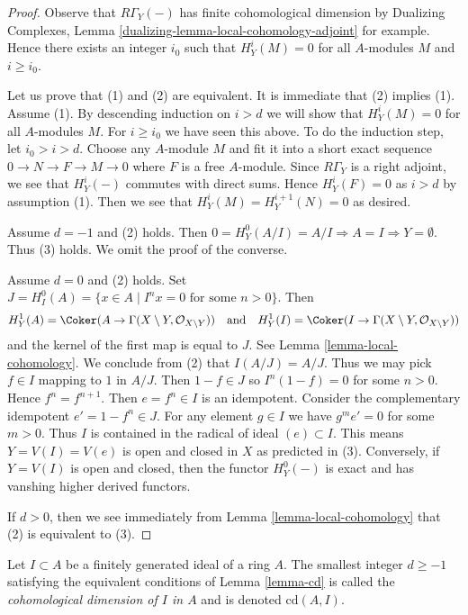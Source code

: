 \begin{proof}
Observe that $R\Gamma_Y(-)$ has finite cohomological dimension by
Dualizing Complexes, Lemma \ref{dualizing-lemma-local-cohomology-adjoint}
for example. Hence there exists an integer $i_0$ such that
$H^i_Y(M) = 0$ for all $A$-modules $M$ and $i \geq i_0$.

\medskip\noindent
Let us prove that (1) and (2) are equivalent. It is immediate that
(2) implies (1). Assume (1). By descending induction on $i > d$
we will show that $H^i_Y(M) = 0$ for all $A$-modules $M$.
For $i \geq i_0$ we have seen this above. To do the induction step,
let $i_0 > i > d$. Choose any $A$-module $M$ and fit it into
a short exact sequence $0 \to N \to F \to M \to 0$ where $F$ is a
free $A$-module. Since $R\Gamma_Y$ is a right adjoint, we see that
$H^i_Y(-)$ commutes with direct sums. Hence $H^i_Y(F) = 0$
as $i > d$ by assumption (1). Then we see that
$H^i_Y(M) = H^{i + 1}_Y(N) = 0$ as desired.

\medskip\noindent
Assume $d = -1$ and (2) holds. Then $0 = H^0_Y(A/I) = A/I \Rightarrow A = I
\Rightarrow Y = \emptyset$. Thus (3) holds. We omit the proof of the converse.

\medskip\noindent
Assume $d = 0$ and (2) holds. Set
$J = H^0_I(A) = \{x \in A \mid I^nx = 0 \text{ for some }n > 0\}$.
Then
$$
H^1_Y(A) = \Coker(A \to \Gamma(X \setminus Y, \mathcal{O}_{X \setminus Y}))
\quad\text{and}\quad
H^1_Y(I) = \Coker(I \to \Gamma(X \setminus Y, \mathcal{O}_{X \setminus Y}))
$$
and the kernel of the first map is equal to $J$. See
Lemma \ref{lemma-local-cohomology}.
We conclude from (2) that $I(A/J) = A/J$.
Thus we may pick $f \in I$
mapping to $1$ in $A/J$. Then $1 - f \in J$ so $I^n(1 - f) = 0$ for some
$n > 0$. Hence $f^n = f^{n + 1}$. Then $e = f^n \in I$ is an idempotent.
Consider the complementary idempotent $e' = 1 - f^n \in J$.
For any element $g \in I$ we have $g^m e' = 0$ for some $m > 0$.
Thus $I$ is contained in the radical of ideal $(e) \subset I$.
This means $Y = V(I) = V(e)$ is open and closed in $X$ as predicted in (3).
Conversely, if $Y = V(I)$ is open and closed, then the functor
$H^0_Y(-)$ is exact and has vanshing higher derived functors.

\medskip\noindent
If $d > 0$, then we see immediately from
Lemma \ref{lemma-local-cohomology} that (2) is equivalent to (3).
\end{proof}

\begin{definition}
\label{definition-cd}
Let $I \subset A$ be a finitely generated ideal of a ring $A$.
The smallest integer $d \geq -1$ satisfying the equivalent conditions
of Lemma \ref{lemma-cd} is called the
{\it cohomological dimension of $I$ in $A$} and is
denoted $\text{cd}(A, I)$.
\end{definition}

